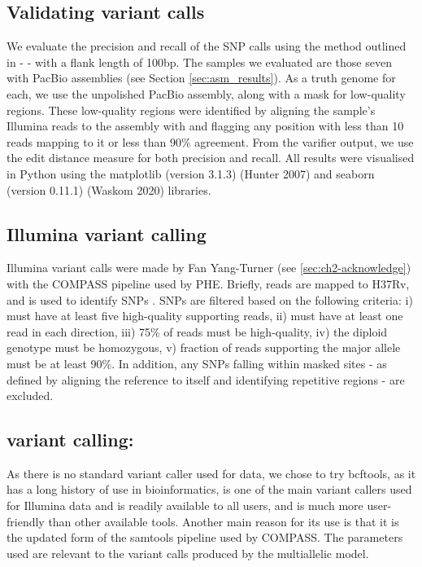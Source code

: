 \subsection{Validating variant calls}

We evaluate the precision and recall of the SNP calls using the method outlined in  -  - with a flank length of 100bp. The samples we evaluated are those seven with PacBio assemblies (see Section \autoref{sec:asm_results}). As a truth genome for each, we use the unpolished  PacBio assembly, along with a mask for low-quality regions. These low-quality regions were identified by aligning the sample's Illumina reads to the assembly with  and flagging any position with less than 10 reads mapping to it or less than 90\% agreement. From the varifier output, we use the edit distance measure for both precision and recall. All results were visualised in Python using the matplotlib (version 3.1.3) (Hunter 2007) and seaborn (version 0.11.1) (Waskom 2020) libraries.

\subsection{Illumina variant calling}
\label{sec:illumina-var-call}

Illumina variant calls were made by Fan Yang-Turner (see \autoref{sec:ch2-acknowledge}) with the COMPASS pipeline used by PHE. Briefly, reads are mapped to H37Rv, and  is used to identify SNPs \cite{samtools2009}. SNPs are filtered based on the following criteria: i) must have at least five high-quality supporting reads, ii) must have at least one read in each direction, iii) 75\% of reads must be high-quality, iv) the diploid genotype must be homozygous, v) fraction of reads supporting the major allele must be at least 90\%. In addition, any SNPs falling within masked sites - as defined by aligning the \mtb{} reference to itself and identifying repetitive regions - are excluded.

\subsection{\ont{} variant calling: }
\label{sec:bcftools-filters}

As there is no standard variant caller used for \mtb{} \ont{} data, we chose to try bcftools, as it has a long history of use in bioinformatics, is one of the main variant callers used for Illumina data  and is readily available to all users, and is much more user-friendly than other available tools. Another main reason for its use is that it is the updated form of the samtools pipeline used by COMPASS. The parameters used are
relevant to the variant calls produced by the multiallelic
model.

